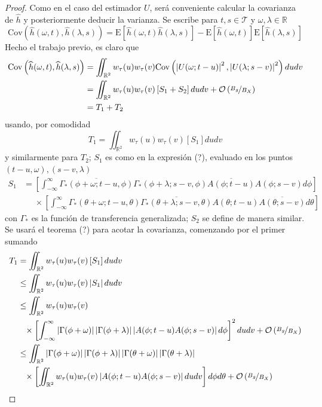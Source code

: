 \documentclass[12pt,letterpaper,draft]{book}
\newcommand{\R}{\mathbb{R}}
\newcommand{\intR}{\int_{-\infty}^{\infty}}
\newcommand{\E}[1]{\mathrm{E}\left[ #1 \right]}
\newcommand{\Cov}[1]{\mathrm{Cov}\left( #1 \right)}
\newcommand{\abso}[1]{\left| #1 \right|}
\newcommand{\orden}[1]{\mathcal{O}\left( #1 \right)}
\newcommand{\pheq}{\phantom{=}}
\begin{document}
\begin{proof}
Como en el caso del estimador $U$, será conveniente calcular la covarianza de $\widehat{h}$ y posteriormente deducir la varianza. Se escribe para $t, s \in \mathcal{T}$ y $\omega, \lambda \in \R$
\begin{equation}
\Cov{\widehat{h}(\omega, t),\widehat{h}(\lambda, s)} = \E{\widehat{h}(\omega, t)\widehat{h}(\lambda, s)} - \E{\widehat{h}(\omega, t)}\E{\widehat{h}(\lambda, s)}
\end{equation}
Hecho el trabajo previo, es claro que
\begin{align*}
\Cov{\widehat{h}(\omega, t), \widehat{h}(\lambda, s)} &=
\iint_{\R^{2}} w_\tau(u) w_\tau(v) \Cov{\abso{U(\omega; t-u)}^{2},\abso{U(\lambda; s-v)}^{2}} du dv \\
&=
\iint_{\R^{2}} w_\tau(u) w_\tau(v) \left[ S_1 + S_2 \right] du dv + \orden{\nicefrac{B_g}{B_X}} \\
&= T_1 + T_2
\end{align*}
usando, por comodidad
\begin{equation}
T_1 = \iint_{\R^{2}} w_\tau(u) w_\tau(v) \left[ S_1 \right] du dv
\end{equation}
y similarmente para $T_2$; $S_1$ es como en la expresión (?), evaluado en los puntos $(t-u,\omega), (s-v, \lambda)$
\begin{align*}
S_1 &=
 \left[ \intR \overline{\Gamma_*(\phi + \omega; t-u, \phi)} \Gamma_*(\phi+ \lambda; s-v, \phi)
 \overline{A(\phi; t-u)} A(\phi; s-v) d\phi \right] \\
 &\pheq \times \left[ \intR \Gamma_*(\theta+ \omega; t-u, \theta) 
  \overline{\Gamma_*(\theta + \lambda; s-v, \theta)}  
 A(\theta; t-u)   \overline{A(\theta; s-v)} d\theta \right] 
\end{align*}
con $\Gamma_*$ es la función de transferencia generalizada; $S_2$ se define de manera similar.
Se usará el teorema (?) para acotar la covarianza, comenzando por el primer sumando
\begin{align*}
T_1 &= 
\iint_{\R^{2}} w_\tau(u) w_\tau(v) \left[ S_1 \right] du dv \\
&\leq
\iint_{\R^{2}} w_\tau(u) w_\tau(v) \abso{ S_1 } du dv \\
&\leq 
\iint_{\R^{2}} 
w_\tau(u) w_\tau(v) \\
&\pheq 
 \times \left[ \intR
 \abso{\Gamma(\phi + \omega)} \abso{\Gamma(\phi+ \lambda)}
 \abso{A(\phi; t-u) A(\phi; s-v)} d\phi \right]^{2}
 du dv + \orden{\nicefrac{B_g}{B_X}} \\
&\leq 
\iint_{\R^{2}} \abso{\Gamma(\phi + \omega)} \abso{\Gamma(\phi+ \lambda)}
\abso{\Gamma(\theta + \omega)} \abso{\Gamma(\theta+ \lambda)} \\
&\pheq 
 \times \left[ \iint_{\R^{2}}  w_\tau(u) w_\tau(v)
 \abso{A(\phi; t-u) A(\phi; s-v)} du dv \right]
 d\phi d\theta + \orden{\nicefrac{B_g}{B_X}} \\
\end{align*}
\end{proof}
\end{document}
